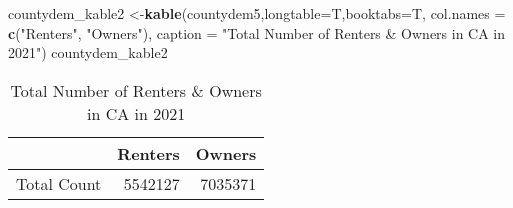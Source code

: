 \documentclass[
]{article}
\newenvironment{Shaded}{\begin{snugshade}}{\end{snugshade}}
\newcommand{\DataTypeTok}[1]{\textcolor[rgb]{0.13,0.29,0.53}{#1}}
\newcommand{\KeywordTok}[1]{\textcolor[rgb]{0.13,0.29,0.53}{\textbf{#1}}}
\newcommand{\NormalTok}[1]{#1}
\newcommand{\StringTok}[1]{\textcolor[rgb]{0.31,0.60,0.02}{#1}}
\begin{document}
\begin{Shaded}
\begin{Highlighting}[]
\NormalTok{countydem_kable2 <-}\KeywordTok{kable}\NormalTok{(countydem5,}\DataTypeTok{longtable=}\NormalTok{T,}\DataTypeTok{booktabs=}\NormalTok{T, }
                         \DataTypeTok{col.names =} \KeywordTok{c}\NormalTok{(}\StringTok{"Renters"}\NormalTok{, }\StringTok{"Owners"}\NormalTok{), }
                         \DataTypeTok{caption =} \StringTok{"Total Number of Renters & Owners in CA in 2021"}\NormalTok{)}
\NormalTok{countydem_kable2}
\end{Highlighting}
\end{Shaded}

\begin{longtable}[t]{lrr}
\caption{\label{tab:unnamed-chunk-24}Total Number of Renters & Owners in CA in 2021}\\
\toprule
  & Renters & Owners\\
\midrule
Total Count & 5542127 & 7035371\\
\bottomrule
\end{longtable}

\newpage
\end{document}
